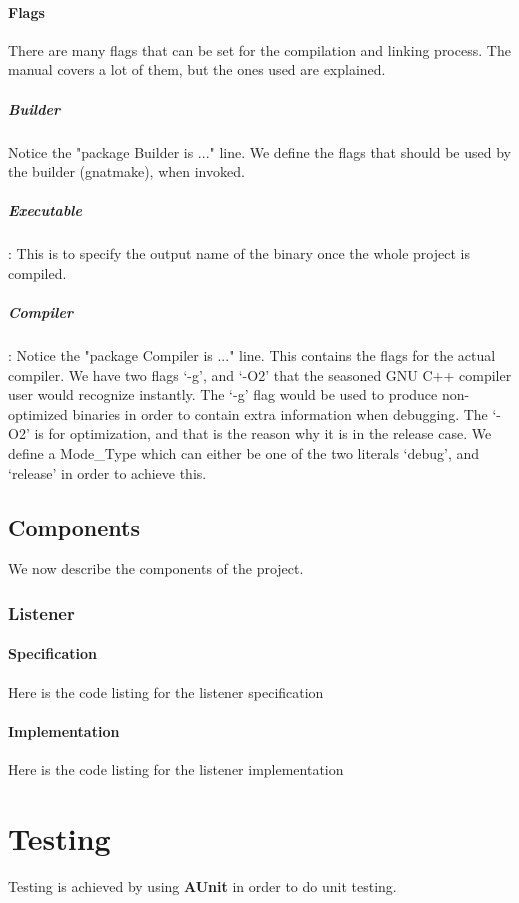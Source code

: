 

\paragraph{Flags} There are many flags that can be set for the compilation and linking process. The manual covers a lot of them, but the ones used are explained.

\subparagraph{Builder} Notice the "package Builder is ..." line. We define the flags that should be used by the builder (gnatmake), when invoked.

\subparagraph{Executable} : This is to specify the output name of the binary once the whole project is compiled.

\subparagraph{Compiler} : Notice the "package Compiler is ..." line. This contains the flags for the actual compiler. We have two flags `-g', and `-O2' that the seasoned GNU C++ compiler user would recognize instantly. The `-g' flag would be used to produce non-optimized binaries in order to contain extra information when debugging. 
The `-O2' is for optimization, and that is the reason why it is in the release case. We define a Mode\_Type which can either be one of the two literals `debug', and `release' in order to achieve this. 

\subsection{Components}
We now describe the components of the project. 

\subsubsection{Listener}
\paragraph{Specification} Here is the code listing for the listener specification


\paragraph{Implementation} Here is the code listing for the listener implementation


\section{Testing}
Testing is achieved by using \textbf{AUnit} in order to do unit testing. 